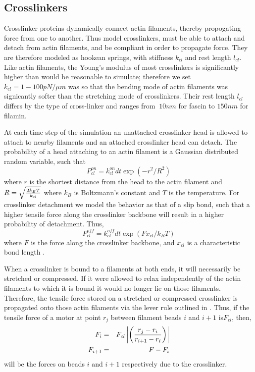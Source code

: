 \documentclass[12pt]{article}
\begin{document}
\subsection{Crosslinkers}
Crosslinker proteins dynamically connect actin filaments, thereby propogating
force from one to
another. Thus model crosslinkers, must be able to attach and detach from actin
filaments,
and be compliant in order to propagate force. They are therefore modeled as
hookean springs, with stiffness $k_{cl}$ and rest length $l_{cl}$. Like actin
filaments, the Young's modulus of most crosslinkers is significantly higher than
would be reasonable to simulate; therefore we set $k_{cl} = 1-100pN/\mu m$ was
so that the bending mode of actin filaments was signicantly softer than the
stretching mode of crosslinkers. Their rest length $l_{cl}$ differs by the type
of cross-linker and ranges from $~10 nm$ for fascin to $150 nm$ for filamin. 
\par
At each time step of the simulation an unattached crosslinker head is allowed to
attach to nearby filaments and an attached crosslinker head can detach. 
The probability of a head attaching to an actin filament is a Gaussian
distributed random variable, such that
\begin{equation}
  P_{cl}^{on} = k_{cl}^{on}dt\exp(-r^2/R^2)
  \label{eqn:cl_on}
\end{equation} 
where $r$ is the shortest distance from the head to the actin filament and $R = \sqrt{2k_B T\over k_{cl}}$ 
where $k_B$ is Boltzmann's constant and $T$ is the temperature. 
For crosslinker detachment we model the behavior as that of a slip bond,
such that a higher tensile force along the crosslinker backbone will result in a 
higher probability of detachment\cite{bell1978}. Thus, 
\begin{equation} 
  P_{cl}^{off} = k_{cl}^{off} dt\exp{\left(  F x_{cl}/k_B T\right)}  
  \label{eqn:cl_off}
\end{equation}
where $F$ is the force along the crosslinker backbone, and $x_{cl}$ is a
characteristic bond length \cite{stam2015}. 
\par
When a crosslinker is bound to a filaments at both ends, it will necessarily be
stretched or compressed. If it were allowed to relax independently of the actin
filaments to which it is bound it would no longer lie on those filaments.
Therefore, the tensile force stored on a stretched or compressed crosslinker is
propagated onto those actin filaments via the lever rule outlined in 
\cite{nedelec2002, gordon2012}. Thus, if the tensile force of a motor at point
$r_j$ between filament beads $i$ and $i+1$ is$F_{cl}$, then, 
\begin{eqnarray} 
  F_i &=& F_{cl}\left|\left( {r_j - r_i \over r_{i+1} - r_i }\right)\right|\\\nonumber
  F_{i+1} &=& F-F_i 
  \label{eqn:lever}
\end{eqnarray}
will be the forces on beads $i$ and $i+1$ respectively due to the crosslinker.
\end{document}
